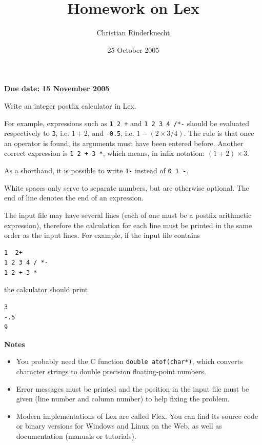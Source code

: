 \documentclass[a4paper,11pt]{article}
\author{Christian Rinderknecht}
\date{25 October 2005}
\title{Homework on Lex}
\newcommand{\Lex}{\textsf{Lex}\xspace}
\newcommand{\Pascal}{\textsf{Pascal}\xspace}
\newcommand{\Clang}{\textsf{C}\xspace}
\begin{document}
\maketitle
\thispagestyle{empty}

\begin{center}
\textbf{Due date: 15 November 2005}
\end{center}

Write an integer postfix calculator in \Lex.

For example, expressions such as \verb|1 2 +| and \verb|1 2 3 4 /*-|
should be evaluated respectively to \verb+3+, i.e. \(1 + 2\), and
\verb|-0.5|, i.e. \(1 - (2 \times 3/4)\). The rule is that once
an operator is found, its arguments must have been entered
before. Another correct expression is \verb|1 2 + 3 *|, which means,
in infix notation: \((1 + 2) \times 3\).

As a shorthand, it is possible to write \verb|1-| instead of
\verb|0 1 -|.

White spaces only serve to separate numbers, but are otherwise
optional. The end of line denotes the end of an expression.

The input file may have several lines (each of one must be a postfix
arithmetic expression), therefore the calculation for each line must
be printed in the same order as the input lines. For example, if the
input file contains
\begin{verbatim}
1  2+
1 2 3 4 / *-
1 2 + 3 *
\end{verbatim}
the calculator should print
\begin{verbatim}
3
-.5
9
\end{verbatim}


\noindent \textbf{Notes}
\begin{itemize}

  \item You probably need the \Clang function
    \verb+double atof(char*)+, which converts character strings to
    double precision floating-point numbers.

  \item Error messages must be printed and the position in the input
    file must be given (line number and column number) to help fixing
    the problem.

  \item Modern implementations of \Lex are called \textsf{Flex}. You
    can find its source code or binary versions for Windows and Linux
    on the Web, as well as documentation (manuals or tutorials).

\end{itemize}
\end{document}
